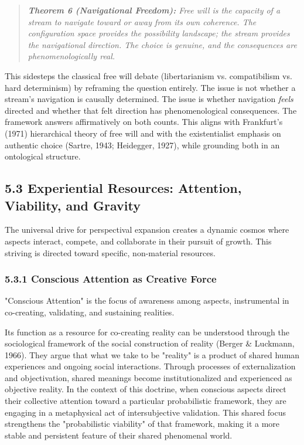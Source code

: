 \begin{quote}
\itshape
\textbf{Theorem 6 (Navigational Freedom):} \textit{Free will is the capacity of a stream to navigate toward or away from its own coherence. The configuration space provides the possibility landscape; the stream provides the navigational direction. The choice is genuine, and the consequences are phenomenologically real.}
\end{quote}


This sidesteps the classical free will debate (libertarianism vs. compatibilism vs. hard determinism) by reframing the question entirely. The issue is not whether a stream's navigation is causally determined. The issue is whether navigation \textit{feels} directed and whether that felt direction has phenomenological consequences. The framework answers affirmatively on both counts. This aligns with Frankfurt's (1971) hierarchical theory of free will and with the existentialist emphasis on authentic choice (Sartre, 1943; Heidegger, 1927), while grounding both in an ontological structure.


\subsection*{5.3 Experiential Resources: Attention, Viability, and Gravity}


The universal drive for perspectival expansion creates a dynamic cosmos where aspects interact, compete, and collaborate in their pursuit of growth. This striving is directed toward specific, non-material resources.


\subsubsection*{5.3.1 Conscious Attention as Creative Force}


"Conscious Attention" is the focus of awareness among aspects, instrumental in co-creating, validating, and sustaining realities.


Its function as a resource for co-creating reality can be understood through the sociological framework of the social construction of reality (Berger \& Luckmann, 1966). They argue that what we take to be "reality" is a product of shared human experiences and ongoing social interactions. Through processes of externalization and objectivation, shared meanings become institutionalized and experienced as objective reality. In the context of this doctrine, when conscious aspects direct their collective attention toward a particular probabilistic framework, they are engaging in a metaphysical act of intersubjective validation. This shared focus strengthens the "probabilistic viability" of that framework, making it a more stable and persistent feature of their shared phenomenal world.


